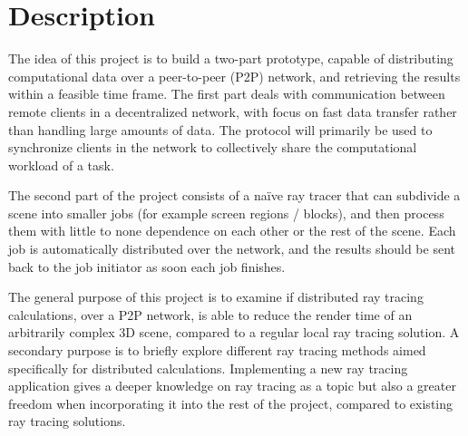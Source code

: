\chapter{Description}


The idea of this project is to build a two-part prototype, capable of distributing computational data over a peer-to-peer (P2P) network, and retrieving the results within a feasible time frame. The first part deals with communication between remote clients in a decentralized network, with focus on fast data transfer rather than handling large amounts of data. The protocol will primarily be used to synchronize clients in the network to collectively share the computational workload of a task. 

The second part of the project consists of a naïve ray tracer that can subdivide a scene into smaller jobs (for example screen regions / blocks), and then process them with little to none dependence on each other or the rest of the scene. Each job is automatically distributed over the network, and the results should be sent back to the job initiator as soon each job finishes.

The general purpose of this project is to examine if distributed ray tracing calculations, over a P2P network, is able to reduce the render time of an arbitrarily complex 3D scene, compared to a regular local ray tracing solution. A secondary purpose is to briefly explore different ray tracing methods aimed specifically for distributed calculations. Implementing a new ray tracing application gives a deeper knowledge on ray tracing as a topic but also a greater freedom when incorporating it into the rest of the project, compared to existing ray tracing solutions.

